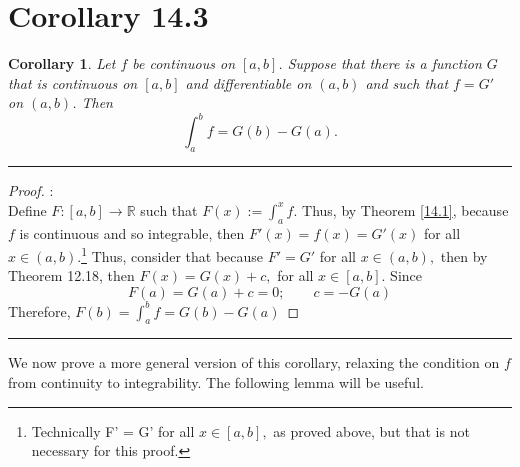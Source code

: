 \documentclass[openany, amssymb, psamsfonts]{amsart}
\newcommand{\bbR}{\mathbb{R}}
\newtheorem{cor}{Corollary}[section]
\theoremstyle{definition}
\numberwithin{equation}{section}
\begin{document}
\section*{Corollary 14.3}
\begin{cor}
\label{14.3}
	Let $f$ be continuous on $[a, b]$. Suppose that there is a function $G$ that is continuous on $[a, b]$ and differentiable on $(a, b)$ and such that $f = G'$ on $(a, b)$. Then
	\[
		\int_{a}^{b} f = G(b) - G(a).
	\]
\end{cor} 
\vspace{4pt}     \hrule   \vspace{4pt} \begin{proof}:\\
    Define $F: [a,b] \to \bbR$ such that $F(x) := \int_a^xf.$ Thus, by Theorem \ref{14.1}, because $f$ is continuous and so integrable, then $F'(x) = f(x) = G'(x)$ for all $x \in (a,b).$\footnote{Technically F' = G' for all $x\in [a,b],$ as proved above, but that is not necessary for this proof.} Thus, consider that because $F'= G'$ for all $x\in (a,b),$ then by Theorem 12.18, then $F(x) = G(x) +c,$  for all $x\in [a,b].$ Since \[F(a) = G(a) + c = 0; \qquad c = -G(a)\] Therefore, $F(b) = \int_a^bf = G(b) - G(a)$
\end{proof}\vspace{4pt}     \hrule   \vspace{4pt} 
We now prove a more general version of this corollary, relaxing the condition on $f$ from continuity to integrability. The following lemma will be useful.
\end{document}
